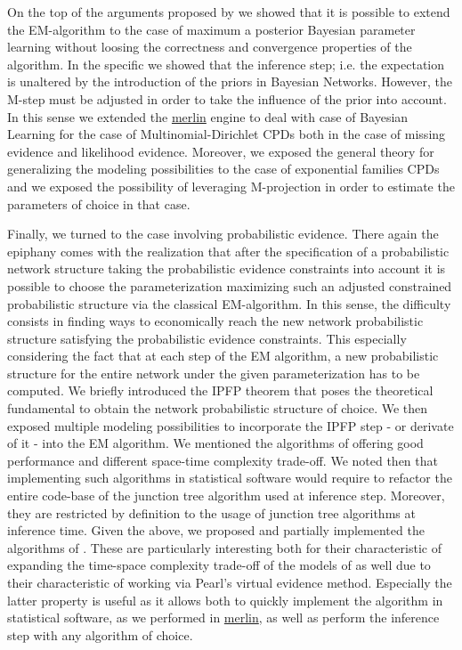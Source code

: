 \documentclass[11pt]{article}
\begin{document}
\begin{article}
On the top of the arguments proposed by \cite{Wasserkrug_all} we
showed that it is possible to extend the EM-algorithm to the case of
maximum a posterior Bayesian parameter learning without loosing the
correctness and convergence properties of the algorithm. In the
specific we showed that the inference step; i.e. the expectation is
unaltered by the introduction of the priors in Bayesian
Networks. However, the M-step must be adjusted in order to take the
influence of the prior into account. In this sense we extended the
\href{https://github.com/radum2275/merlin}{merlin} engine to deal with case of Bayesian Learning for the case of
Multinomial-Dirichlet CPDs both in the case of missing evidence and
likelihood evidence. Moreover, we exposed the general theory for
generalizing the modeling possibilities to the case of exponential
families CPDs and we exposed the possibility of leveraging
M-projection in order to estimate the parameters of choice in that
case.

Finally, we turned to the case involving probabilistic
evidence. There again the epiphany comes with the realization that
after the specification of a probabilistic network structure taking
the probabilistic evidence constraints into account it is possible
to choose the parameterization maximizing such an adjusted
constrained probabilistic structure via the classical EM-algorithm.
In this sense, the difficulty consists in finding ways to
economically reach the new network probabilistic structure
satisfying the probabilistic evidence constraints. This especially
considering the fact that at each step of the EM algorithm, a new
probabilistic structure for the entire network under the given
parameterization has to be computed. We briefly introduced the IPFP
theorem that poses the theoretical fundamental to obtain the network
probabilistic structure of choice. We then exposed multiple modeling
possibilities to incorporate the IPFP step - or derivate of it -
into the EM algorithm. We mentioned the algorithms of
\cite{Valtorta_2002} offering good performance and different
space-time complexity trade-off. We noted then that implementing such
algorithms in statistical software would require to refactor the
entire code-base of the junction tree algorithm used at inference
step. Moreover, they are restricted by definition to the usage of
junction tree algorithms at inference time. Given the above, we
proposed and partially implemented the algorithms of
\cite{PENG_2010}. These are particularly interesting both for their
characteristic of expanding the time-space complexity trade-off
of the models of \cite{Valtorta_2002} as well due to their
characteristic of working via Pearl's virtual evidence
method. Especially the latter property is useful as it allows both
to quickly implement the algorithm in statistical software, as we
performed in \href{https://github.com/radum2275/merlin}{merlin}, as well as perform the inference step with any
algorithm of choice.


\end{article}
\end{document}
